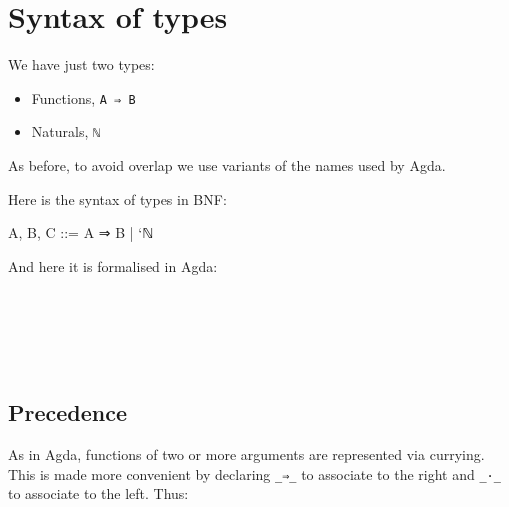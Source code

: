 \hypertarget{syntax-of-types}{%
\section{Syntax of types}\label{syntax-of-types}}

We have just two types:

\begin{itemize}
\tightlist
\item
  Functions, \texttt{A\ ⇒\ B}
\item
  Naturals, \texttt{\textasciigrave{}ℕ}
\end{itemize}

As before, to avoid overlap we use variants of the names used by Agda.

Here is the syntax of types in BNF:

\begin{myDisplay}
A, B, C  ::=  A ⇒ B | `ℕ
\end{myDisplay}

And here it is formalised in Agda:

\begin{fence}
\begin{code}%
\>[0]\AgdaSpace{}%
\AgdaSpace{}%
\<%
\\
%
\\[\AgdaEmptyExtraSkip]%
\>[0]\AgdaSpace{}%
\AgdaSpace{}%
\AgdaSymbol{:}\AgdaSpace{}%
\AgdaSpace{}%
\<%
\\
\>[0][@{}l@{\AgdaIndent{0}}]%
\>[2]\AgdaSpace{}%
\AgdaSymbol{:}\AgdaSpace{}%
\AgdaSpace{}%
\AgdaSpace{}%
\AgdaSpace{}%
\AgdaSpace{}%
\<%
\\
%
\>[2]\AgdaSpace{}%
\AgdaSymbol{:}\AgdaSpace{}%
\<%
\end{code}
\end{fence}

\hypertarget{precedence}{%
\subsection{Precedence}\label{precedence}}

As in Agda, functions of two or more arguments are represented via
currying. This is made more convenient by declaring \texttt{\_⇒\_} to
associate to the right and \texttt{\_·\_} to associate to the left.
Thus:

